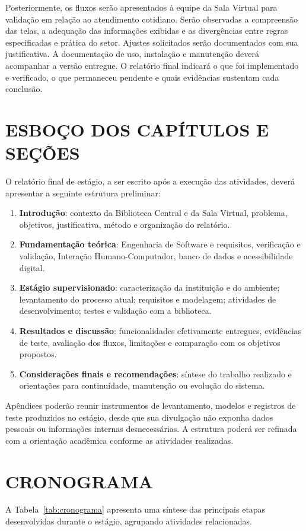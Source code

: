 \documentclass[12pt,a4paper]{article}
\newcommand{\secao}[1]{\clearpage\section{#1}}
\begin{document}
Posteriormente, os fluxos serão apresentados à equipe da Sala Virtual para validação em relação ao atendimento cotidiano. Serão observadas a compreensão das telas, a adequação das informações exibidas e as divergências entre regras especificadas e prática do setor. Ajustes solicitados serão documentados com sua justificativa. A documentação de uso, instalação e manutenção deverá acompanhar a versão entregue. O relatório final indicará o que foi implementado e verificado, o que permaneceu pendente e quais evidências sustentam cada conclusão.

\secao{ESBOÇO DOS CAPÍTULOS E SEÇÕES}

O relatório final de estágio, a ser escrito após a execução das atividades, deverá apresentar a seguinte estrutura preliminar:

\begin{enumerate}
  \item \textbf{Introdução}: contexto da Biblioteca Central e da Sala Virtual, problema, objetivos, justificativa, método e organização do relatório.
  \item \textbf{Fundamentação teórica}: Engenharia de Software e requisitos, verificação e validação, Interação Humano-Computador, banco de dados e acessibilidade digital.
  \item \textbf{Estágio supervisionado}: caracterização da instituição e do ambiente; levantamento do processo atual; requisitos e modelagem; atividades de desenvolvimento; testes e validação com a biblioteca.
  \item \textbf{Resultados e discussão}: funcionalidades efetivamente entregues, evidências de teste, avaliação dos fluxos, limitações e comparação com os objetivos propostos.
  \item \textbf{Considerações finais e recomendações}: síntese do trabalho realizado e orientações para continuidade, manutenção ou evolução do sistema.
\end{enumerate}

Apêndices poderão reunir instrumentos de levantamento, modelos e registros de teste produzidos no estágio, desde que sua divulgação não exponha dados pessoais ou informações internas desnecessárias. A estrutura poderá ser refinada com a orientação acadêmica conforme as atividades realizadas.

\secao{CRONOGRAMA}

A Tabela~\ref{tab:cronograma} apresenta uma síntese das principais etapas desenvolvidas durante o estágio, agrupando atividades relacionadas.
\end{document}
